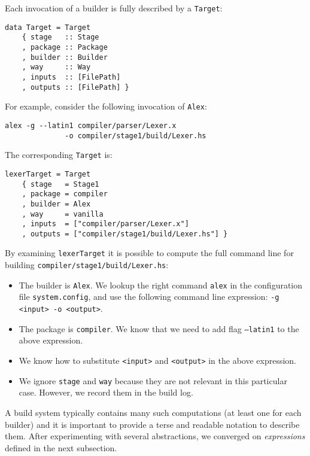 Each invocation of a builder is fully described by a \texttt{Target}:

\begin{lstlisting}[basicstyle=\ttfamily]
data Target = Target
    { stage   :: Stage
    , package :: Package
    , builder :: Builder
    , way     :: Way
    , inputs  :: [FilePath]
    , outputs :: [FilePath] }
\end{lstlisting}

\noindent For example, consider the following invocation of \texttt{Alex}:

\begin{verbatim}
alex -g --latin1 compiler/parser/Lexer.x
              -o compiler/stage1/build/Lexer.hs
\end{verbatim}

\noindent The corresponding \texttt{Target} is:

\begin{lstlisting}[basicstyle=\ttfamily]
lexerTarget = Target
    { stage   = Stage1
    , package = compiler
    , builder = Alex
    , way     = vanilla
    , inputs  = ["compiler/parser/Lexer.x"]
    , outputs = ["compiler/stage1/build/Lexer.hs"] }
\end{lstlisting}

By examining \texttt{lexerTarget} it is possible to compute the full command
line for building \texttt{compiler/stage1/build/Lexer.hs}:
\begin{itemize}
  \item The builder is \texttt{Alex}. We lookup the right command
  \texttt{alex} in the configuration file \texttt{system.config}, and use the
  following command line expression: \texttt{-g <input> -o <output>}.
  \item The package is \texttt{compiler}. We know that we need to add
  flag \texttt{--latin1} to the above expression.
  \item We know how to substitute \texttt{<input>} and \texttt{<output>} in the
  above expression.
  \item We ignore \texttt{stage} and \texttt{way} because they are not relevant
  in this particular case. However, we record them in the build log.
\end{itemize}

A build system typically contains many such computations (at least one for each
builder) and it is important to provide a terse and readable notation to
describe them. After experimenting with several abstractions, we converged on
\emph{expressions} defined in the next subsection.


